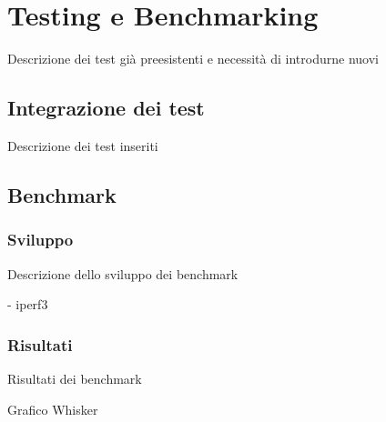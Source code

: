 \chapter{Testing e Benchmarking}

Descrizione dei test già preesistenti e necessità di introdurne nuovi

\section{Integrazione dei test}

Descrizione dei test inseriti

\section{Benchmark}

\subsection{Sviluppo}

Descrizione dello sviluppo dei benchmark

- iperf3

\subsection{Risultati}

Risultati dei benchmark

Grafico Whisker
